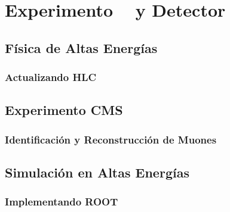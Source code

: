 \documentclass[12pt]{report}
\begin{document}
		
				


\chapter{Experimento \LHC ~ y Detector \CMS}

		
	\section{Física de Altas Energías}
	
		
		\subsection{Actualizando HLC}	
		
	
	\section{Experimento CMS}\label{Experimento_CMS}
	
	
	
		\subsection{Identificación y Reconstrucción de Muones}
		
		
	\section{Simulación en Altas Energías}
	
	
		\subsection{Implementando ROOT}\label{C_root}
		
		
		
\end{document}
